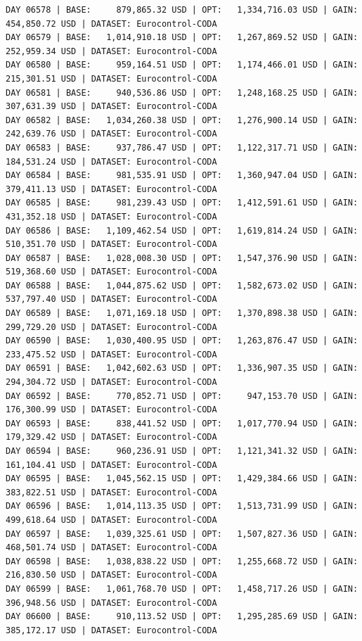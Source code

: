 \documentclass[11pt,a4paper]{article}
\begin{document}
\begin{verbatim}
DAY 06578 | BASE:     879,865.32 USD | OPT:   1,334,716.03 USD | GAIN: 454,850.72 USD | DATASET: Eurocontrol-CODA
DAY 06579 | BASE:   1,014,910.18 USD | OPT:   1,267,869.52 USD | GAIN: 252,959.34 USD | DATASET: Eurocontrol-CODA
DAY 06580 | BASE:     959,164.51 USD | OPT:   1,174,466.01 USD | GAIN: 215,301.51 USD | DATASET: Eurocontrol-CODA
DAY 06581 | BASE:     940,536.86 USD | OPT:   1,248,168.25 USD | GAIN: 307,631.39 USD | DATASET: Eurocontrol-CODA
DAY 06582 | BASE:   1,034,260.38 USD | OPT:   1,276,900.14 USD | GAIN: 242,639.76 USD | DATASET: Eurocontrol-CODA
DAY 06583 | BASE:     937,786.47 USD | OPT:   1,122,317.71 USD | GAIN: 184,531.24 USD | DATASET: Eurocontrol-CODA
DAY 06584 | BASE:     981,535.91 USD | OPT:   1,360,947.04 USD | GAIN: 379,411.13 USD | DATASET: Eurocontrol-CODA
DAY 06585 | BASE:     981,239.43 USD | OPT:   1,412,591.61 USD | GAIN: 431,352.18 USD | DATASET: Eurocontrol-CODA
DAY 06586 | BASE:   1,109,462.54 USD | OPT:   1,619,814.24 USD | GAIN: 510,351.70 USD | DATASET: Eurocontrol-CODA
DAY 06587 | BASE:   1,028,008.30 USD | OPT:   1,547,376.90 USD | GAIN: 519,368.60 USD | DATASET: Eurocontrol-CODA
DAY 06588 | BASE:   1,044,875.62 USD | OPT:   1,582,673.02 USD | GAIN: 537,797.40 USD | DATASET: Eurocontrol-CODA
DAY 06589 | BASE:   1,071,169.18 USD | OPT:   1,370,898.38 USD | GAIN: 299,729.20 USD | DATASET: Eurocontrol-CODA
DAY 06590 | BASE:   1,030,400.95 USD | OPT:   1,263,876.47 USD | GAIN: 233,475.52 USD | DATASET: Eurocontrol-CODA
DAY 06591 | BASE:   1,042,602.63 USD | OPT:   1,336,907.35 USD | GAIN: 294,304.72 USD | DATASET: Eurocontrol-CODA
DAY 06592 | BASE:     770,852.71 USD | OPT:     947,153.70 USD | GAIN: 176,300.99 USD | DATASET: Eurocontrol-CODA
DAY 06593 | BASE:     838,441.52 USD | OPT:   1,017,770.94 USD | GAIN: 179,329.42 USD | DATASET: Eurocontrol-CODA
DAY 06594 | BASE:     960,236.91 USD | OPT:   1,121,341.32 USD | GAIN: 161,104.41 USD | DATASET: Eurocontrol-CODA
DAY 06595 | BASE:   1,045,562.15 USD | OPT:   1,429,384.66 USD | GAIN: 383,822.51 USD | DATASET: Eurocontrol-CODA
DAY 06596 | BASE:   1,014,113.35 USD | OPT:   1,513,731.99 USD | GAIN: 499,618.64 USD | DATASET: Eurocontrol-CODA
DAY 06597 | BASE:   1,039,325.61 USD | OPT:   1,507,827.36 USD | GAIN: 468,501.74 USD | DATASET: Eurocontrol-CODA
DAY 06598 | BASE:   1,038,838.22 USD | OPT:   1,255,668.72 USD | GAIN: 216,830.50 USD | DATASET: Eurocontrol-CODA
DAY 06599 | BASE:   1,061,768.70 USD | OPT:   1,458,717.26 USD | GAIN: 396,948.56 USD | DATASET: Eurocontrol-CODA
DAY 06600 | BASE:     910,113.52 USD | OPT:   1,295,285.69 USD | GAIN: 385,172.17 USD | DATASET: Eurocontrol-CODA

\end{verbatim}
\end{document}
